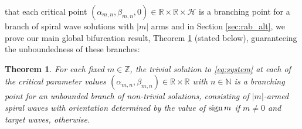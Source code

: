 \documentclass[11pt]{amsart}
\def\bn{{\mathbb{N}}}
\def\br{{\mathbb{R}}}
\def\bz{{\mathbb{Z}}}
\def\br{\mathbb R}
\def\sign{\text{\rm sign\,}}
\newtheorem{theorem}{Theorem}[section]
\begin{document}
that each critical point $(\alpha_{m,n},\beta_{m,n},0) \in \br \times \br \times \mathscr H$ is a branching point for a branch of spiral wave solutions with $|m|$ arms and 
in Section \ref{sec:rab_alt}, we prove our main global bifurcation result, Theorem \ref{thm:main_global_bif} (stated below),  guaranteeing the unboundedness of these branches:
\begin{theorem}\label{thm:main_global_bif}
For each fixed $m \in \bz$, the trivial solution to \eqref{eq:system} at each of the critical parameter values $(\alpha_{m,n},\beta_{m,n}) \in \br \times \br$ with $n \in \bn$
is a branching point for an unbounded branch of non-trivial solutions, consisting of $|m|$-armed spiral waves with orientation determined by the value of $\sign m$ if $m \neq 0$ and target waves, otherwise.
\end{theorem}
\end{document}
